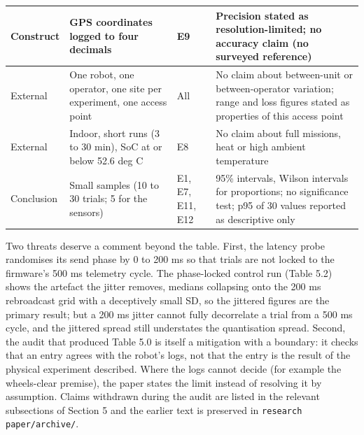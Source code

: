 \begin{center}
\begin{longtable}{|p{1.6cm}|p{4.5cm}|p{2cm}|p{5cm}|}
\hline
Construct & GPS coordinates logged to four decimals & E9 & Precision stated as resolution-limited; no accuracy claim (no surveyed reference) \\
\hline
External & One robot, one operator, one site per experiment, one access point & All & No claim about between-unit or between-operator variation; range and loss figures stated as properties of this access point \\
\hline
External & Indoor, short runs (3 to 30 min), SoC at or below 52.6 deg C & E8 & No claim about full missions, heat or high ambient temperature \\
\hline
Conclusion & Small samples (10 to 30 trials; 5 for the sensors) & E1, E7, E11, E12 & 95\% intervals, Wilson intervals for proportions; no significance test; p95 of 30 values reported as descriptive only \\
\hline
\end{longtable}
\end{center}

Two threats deserve a comment beyond the table. First, the latency probe randomises its send phase by 0 to 200 ms so that trials are not locked to the firmware's 500 ms telemetry cycle. The phase-locked control run (Table 5.2) shows the artefact the jitter removes, medians collapsing onto the 200 ms rebroadcast grid with a deceptively small SD, so the jittered figures are the primary result; but a 200 ms jitter cannot fully decorrelate a trial from a 500 ms cycle, and the jittered spread still understates the quantisation spread. Second, the audit that produced Table 5.0 is itself a mitigation with a boundary: it checks that an entry agrees with the robot's logs, not that the entry is the result of the physical experiment described. Where the logs cannot decide (for example the wheels-clear premise), the paper states the limit instead of resolving it by assumption. Claims withdrawn during the audit are listed in the relevant subsections of Section 5 and the earlier text is preserved in \texttt{research paper/archive/}.
